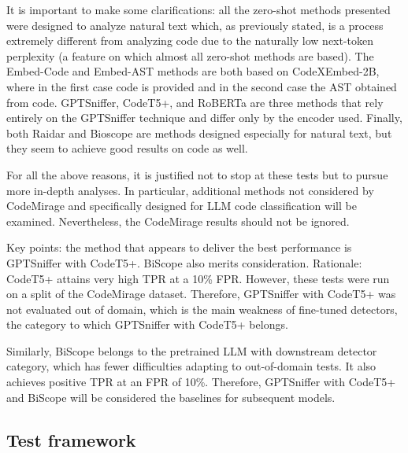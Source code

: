 It is important to make some clarifications: all the zero-shot 
methods presented were designed to analyze natural text which, 
as previously stated, is a process extremely different from 
analyzing code due to the naturally low next-token perplexity 
(a feature on which almost all zero-shot methods are based). 
The Embed-Code and Embed-AST methods are both based on 
CodeXEmbed-2B\cite{liu2024codexembed}, where in the first case code is provided and 
in the second case the AST obtained from code. GPTSniffer, 
CodeT5+, and RoBERTa are three methods that rely entirely on 
the GPTSniffer\cite{nguyen2024gptsniffer} technique and differ only by the encoder used. 
Finally, both Raidar and Bioscope are methods designed especially 
for natural text, but they seem to achieve good results on code as well.

For all the above reasons, it is justified not to stop at these tests but to pursue more in-depth analyses. In particular, additional methods not considered by CodeMirage and specifically designed for LLM code classification will be examined. Nevertheless, the CodeMirage results should not be ignored.

Key points: the method that appears to deliver the best performance 
is GPTSniffer with CodeT5+. BiScope also merits consideration. 
Rationale: CodeT5+ attains very high TPR at a 10\% 
FPR. However, these tests were run on a split of the 
CodeMirage dataset. Therefore, GPTSniffer with CodeT5+ 
was not evaluated out of domain, which is the main weakness 
of fine-tuned detectors, the category to which GPTSniffer with 
CodeT5+ belongs.

Similarly, BiScope belongs to the pretrained LLM with 
downstream detector category, which has fewer difficulties 
adapting to out-of-domain tests. It also achieves positive 
TPR at an FPR of 10\%. Therefore, GPTSniffer with 
CodeT5+ and BiScope will be considered the baselines 
for subsequent models.
\subsection{Test framework}
